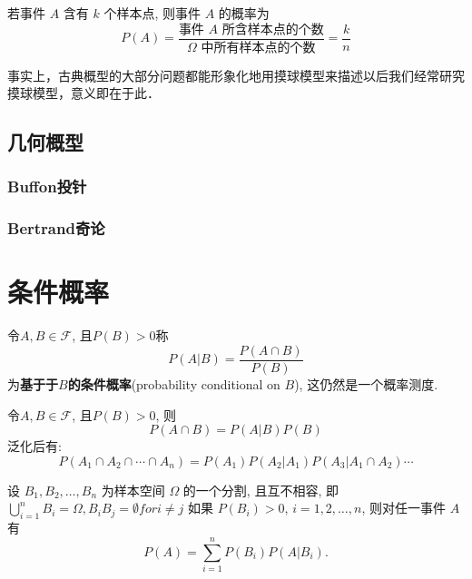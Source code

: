 \begin{definition}
    若事件 $A$ 含有 $k$ 个样本点, 则事件 $A$ 的概率为
    \[  P (A) = \frac{\text{事件 } A \text{ 所含样本点的个数}}{\Omega \text{ 中所有样本点的个数}} = \frac{k}{n} \]
\end{definition}

\begin{note}
    事实上，古典概型的大部分问题都能形象化地用摸球模型来描述以后我们经常研究摸球模型，意义即在于此．
\end{note}

\subsection{几何概型}

\subsubsection{Buffon投针}

\subsubsection{Bertrand奇论}

\section{条件概率}

\begin{definition}[条件概率]
    令$A,B \in \mathscr{F}$, 且$P(B)>0$称
    \[ P(A|B) = \frac{P(A \cap B)}{P(B)}\]
    为\textbf{基于于$B$的条件概率}(probability conditional on $B$), 这仍然是一个概率测度.
\end{definition}

\begin{theorem}[乘法法则]
    令$A,B \in \mathscr{F}$, 且$P(B)>0$, 则
    \[ P(A \cap B) = P(A|B)P(B) \]
    泛化后有:
    \[ P(A_1 \cap A_2 \cap \cdots \cap A_n) = P(A_{1})P(A_2|A_1)P(A_3|A_1\cap A_2) \cdots  \]
\end{theorem}

\begin{theorem}[全概率公式]
    设 $B_1, B_2, \dotsc, B_n$ 为样本空间 $\Omega$ 的一个分割, 且互不相容, 即$\bigcup _{i=1} ^n B_i = \Omega, B_i B_j= \emptyset for i \neq j $
    如果 $P(B_i) > 0$, $i=1, 2, \dotsc, n$,
    则对任一事件 $A$ 有
    \begin{equation}
        P(A) = \sum_{i=1}^n P(B_i) P(A | B_i).
    \end{equation}
\end{theorem}


